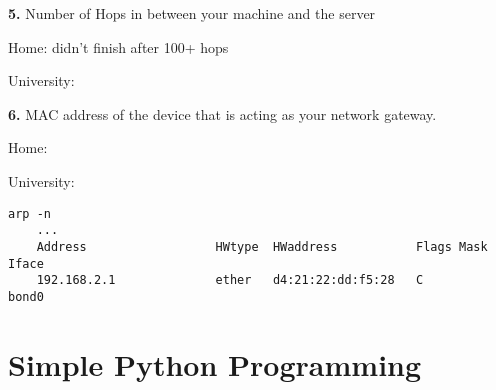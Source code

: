 \documentclass[12pt]{article}
\begin{document}
\textbf{5.} Number of Hops in between your machine and the server

Home: didn't finish after 100+ hops

University: 

\textbf{6.} MAC address of the device that is acting as your network gateway.

Home:

University: 

\begin{lstlisting}[caption=arp home]
	arp -n
	...
	Address                  HWtype  HWaddress           Flags Mask            Iface
	192.168.2.1              ether   d4:21:22:dd:f5:28   C                     bond0
\end{lstlisting}


\section{Simple Python Programming}

\lstset{language=python, breaklines=true, frame=single}

\end{document}
